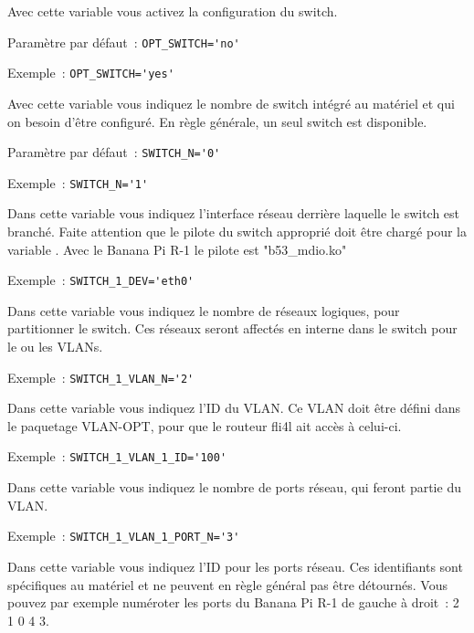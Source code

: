 \begin{description}

Avec cette variable vous activez la configuration du switch.

Paramètre par défaut~: \verb+OPT_SWITCH='no'+

Exemple~: \verb+OPT_SWITCH='yes'+


Avec cette variable vous indiquez le nombre de switch intégré au matériel et qui
on besoin d'être configuré. En règle générale, un seul switch est disponible.

Paramètre par défaut~: \verb+SWITCH_N='0'+

Exemple~: \verb+SWITCH_N='1'+


Dans cette variable vous indiquez l'interface réseau derrière laquelle le switch
est branché. Faite attention que le pilote du switch approprié doit être chargé pour
la variable . Avec le Banana Pi R-1 le pilote est "b53\_mdio.ko"

Exemple~: \verb+SWITCH_1_DEV='eth0'+


Dans cette variable vous indiquez le nombre de réseaux logiques, pour partitionner
le switch. Ces réseaux seront affectés en interne dans le switch pour le ou les VLANs.

Exemple~: \verb+SWITCH_1_VLAN_N='2'+


Dans cette variable vous indiquez l'ID du VLAN. Ce VLAN doit être défini dans le
paquetage VLAN-OPT, pour que le routeur fli4l ait accès à celui-ci.

Exemple~: \verb+SWITCH_1_VLAN_1_ID='100'+


Dans cette variable vous indiquez le nombre de ports réseau, qui feront partie du VLAN.

Exemple~: \verb+SWITCH_1_VLAN_1_PORT_N='3'+


Dans cette variable vous indiquez l'ID pour les ports réseau. Ces identifiants sont
spécifiques au matériel et ne peuvent en règle général pas être détournés. Vous pouvez
par exemple numéroter les ports du Banana Pi R-1 de gauche à droit~: 2 1 0 4 3.


\end{description}

